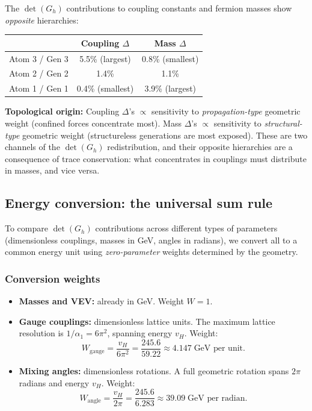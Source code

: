 \documentclass[12pt]{article}
\theoremstyle{remark}
\theoremstyle{definition}
\begin{document}
The $\det(G_h)$ contributions to coupling constants and fermion masses show \emph{opposite} hierarchies:

\begin{center}
\begin{tabular}{lcc}
\hline
& Coupling $\Delta$ & Mass $\Delta$ \\
\hline
Atom 3 / Gen 3 & 5.5\% (largest) & 0.8\% (smallest) \\
Atom 2 / Gen 2 & 1.4\% & 1.1\% \\
Atom 1 / Gen 1 & 0.4\% (smallest) & 3.9\% (largest) \\
\hline
\end{tabular}
\end{center}

\textbf{Topological origin:} Coupling $\Delta$'s $\propto$ sensitivity to \emph{propagation-type} geometric weight (confined forces concentrate most). Mass $\Delta$'s $\propto$ sensitivity to \emph{structural-type} geometric weight (structureless generations are most exposed). These are two channels of the $\det(G_h)$ redistribution, and their opposite hierarchies are a consequence of trace conservation: what concentrates in couplings must distribute in masses, and vice versa.

\subsection{Energy conversion: the universal sum rule}

To compare $\det(G_h)$ contributions across different types of parameters (dimensionless couplings, masses in GeV, angles in radians), we convert all to a common energy unit using \emph{zero-parameter} weights determined by the geometry.

\subsubsection{Conversion weights}

\begin{itemize}
\item \textbf{Masses and VEV:} already in GeV. Weight $W = 1$.
\item \textbf{Gauge couplings:} dimensionless lattice units. The maximum lattice resolution is $1/\alpha_1 = 6\pi^2$, spanning energy $v_H$. Weight:
\begin{equation}
W_\text{gauge} = \frac{v_H}{6\pi^2} = \frac{245.6}{59.22} \approx 4.147\;\text{GeV per unit}.
\end{equation}
\item \textbf{Mixing angles:} dimensionless rotations. A full geometric rotation spans $2\pi$ radians and energy $v_H$. Weight:
\begin{equation}
W_\text{angle} = \frac{v_H}{2\pi} = \frac{245.6}{6.283} \approx 39.09\;\text{GeV per radian}.
\end{equation}
\end{itemize}
\end{document}
